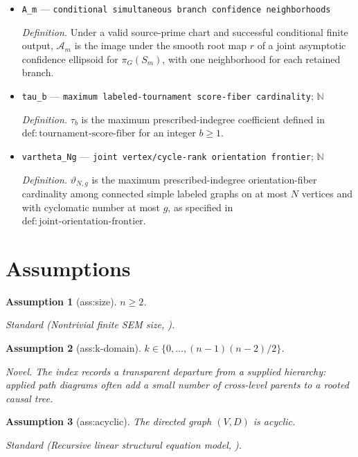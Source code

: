 \documentclass{article}
\newtheorem{assumption}{Assumption}
\begin{document}
\begin{itemize}
  \item \texttt{A\_\allowbreak{}m} --- \texttt{conditional simultaneous branch confidence neighborhoods}
  \par\smallskip\noindent\emph{Definition.} Under a valid source-prime chart and successful conditional finite output, \(\mathcal A_m\) is the image under the smooth root map \(r\) of a joint asymptotic confidence ellipsoid for \(\pi_G(S_m)\), with one neighborhood for each retained branch.
  \item \texttt{tau\_\allowbreak{}b} --- \texttt{maximum labeled-\allowbreak{}tournament score-\allowbreak{}fiber cardinality}; \(\mathbb N\)
  \par\smallskip\noindent\emph{Definition.} \(\tau_b\) is the maximum prescribed-indegree coefficient defined in \(\mathrm{def:tournament\mbox{-}score\mbox{-}fiber}\) for an integer \(b\geq1\).
  \item \texttt{vartheta\_\allowbreak{}Ng} --- \texttt{joint vertex/\allowbreak{}cycle-\allowbreak{}rank orientation frontier}; \(\mathbb N\)
  \par\smallskip\noindent\emph{Definition.} \(\vartheta_{N,g}\) is the maximum prescribed-indegree orientation-fiber cardinality among connected simple labeled graphs on at most \(N\) vertices and with cyclomatic number at most \(g\), as specified in \(\mathrm{def:joint\mbox{-}orientation\mbox{-}frontier}\).
\end{itemize}

\section{Assumptions}

\begin{assumption}[ass:size]\label{ass:size}
\(n\ge2\).
\par\smallskip\noindent\emph{Standard} (Nontrivial finite SEM size, \cite{GuptaBlaser2024TreeSCM}).
\end{assumption}

\begin{assumption}[ass:k-domain]\label{ass:k-domain}
\(k\in\{0,\ldots,(n-1)(n-2)/2\}\).
\par\smallskip\noindent\emph{Novel.} The index records a transparent departure from a supplied hierarchy: applied path diagrams often add a small number of cross-level parents to a rooted causal tree.
\end{assumption}

\begin{assumption}[ass:acyclic]\label{ass:acyclic}
The directed graph \( (V,D) \) is acyclic.
\par\smallskip\noindent\emph{Standard} (Recursive linear structural equation model, \cite{FoygelDraismaDrton2012HTC}).
\end{assumption}
\end{document}

